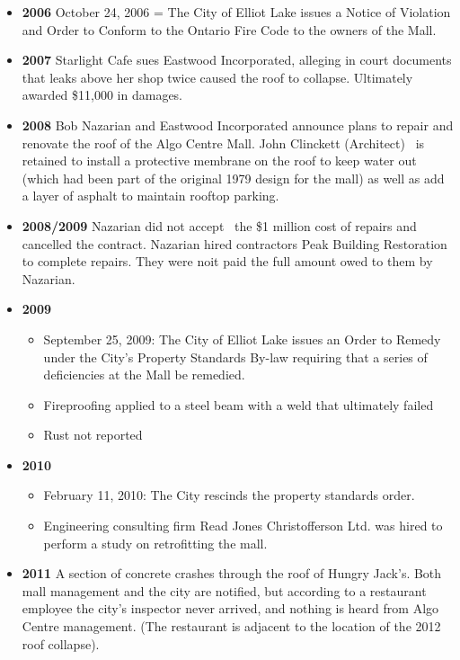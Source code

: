 \documentclass[12pt]{article}
\begin{document}
\begin{itemize}
    \item \textbf{\textbf{2006}}
October 24, 2006 = The City of Elliot Lake issues a Notice of Violation and Order to Conform to the Ontario Fire Code to the owners of the Mall.

    \item \textbf{\textbf{2007}}
Starlight Cafe sues Eastwood Incorporated, alleging in court documents that leaks above her shop twice caused the roof to collapse. Ultimately awarded \$11,000 in damages.

    \item \textbf{\textbf{2008}}
Bob Nazarian and Eastwood Incorporated announce plans to repair and renovate the roof of the Algo Centre Mall. John Clinckett (Architect)  is retained to install a protective membrane on the roof to keep water out (which had been part of the original 1979 design for the mall) as well as add a layer of asphalt to maintain rooftop parking.

    \item \textbf{\textbf{2008/2009}}
Nazarian did not accept  the \$1 million cost of repairs and cancelled the contract. Nazarian hired contractors Peak Building Restoration to complete repairs. They were noit paid the full amount owed to them by Nazarian. 

    \item \textbf{\textbf{2009}}
    \begin{itemize}
        \item September 25, 2009: The City of Elliot Lake issues an Order to Remedy under the City’s Property Standards By-law requiring that a series of deficiencies at the Mall be remedied.
        \item Fireproofing applied to a steel beam with a weld that ultimately failed
        \item Rust not reported
    \end{itemize}
    \item \textbf{\textbf{2010}}
    \begin{itemize}
        \item February 11, 2010: The City rescinds the property standards order.
        \item Engineering consulting firm Read Jones Christofferson Ltd. was hired to perform a study on retrofitting the mall. 
    \end{itemize}
    \item \textbf{\textbf{2011}}
A section of concrete crashes through the roof of Hungry Jack’s. Both mall management and the city are notified, but according to a restaurant employee the city’s inspector never arrived, and nothing is heard from Algo Centre management. (The restaurant is adjacent to the location of the 2012 roof collapse).


\end{itemize}
\end{document}

